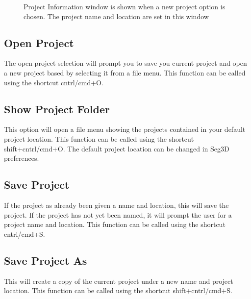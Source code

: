 \documentclass[fleqn,11pt,openany]{book}
\begin{document}
\begin{figure}[h!]
\caption{Project Information window is shown when a new project option is chosen. The project name and location are set in this window}\label{fig:newproject}
\end{figure}

\subsection{Open Project}
\label{sec:openproject}
The open project selection will prompt you to save you current project and open a new project based by selecting it from a file menu.  This function can be called using the shortcut cntrl/cmd+O.

\subsection{Show Project Folder}
This option will open a file menu showing the projects contained in your default project location.  This function can be called using the shortcut shift+cntrl/cmd+O.  The default project location can be changed in Seg3D preferences.

\subsection{Save Project}
If the project as already been given a name and location, this will save the project.  If the project has not yet been named, it will prompt the user for a project name and location.  This function can be called using the shortcut cntrl/cmd+S.

\subsection{Save Project As}
\label{sec:saveprojectas}
This will create a copy of the current project under a new name and project location.  This function can be called using the shortcut shift+cntrl/cmd+S.
\end{document}
